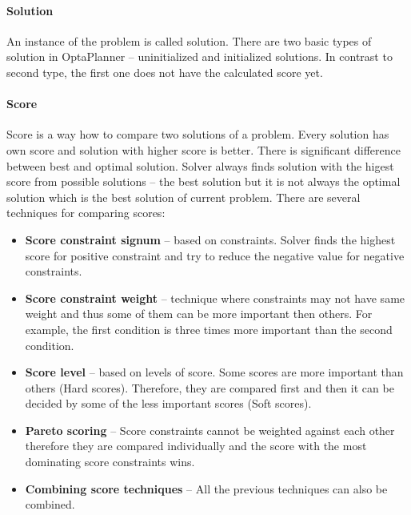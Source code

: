\paragraph{Solution}
An instance of the problem is called solution. There are two basic types of solution in OptaPlanner -- uninitialized and initialized solutions. In contrast to second type, the first one does not have the calculated score yet.

\paragraph{Score}\label{score}
Score is a way how to compare two solutions of a problem. Every solution has own score and solution with higher score is better. There is significant difference between best and optimal solution. Solver always finds solution with the higest score from possible solutions -- the best solution but it is not always the optimal solution which is the best solution of current problem. There are several techniques for comparing scores:
\begin{itemize}
\item \textbf{Score constraint signum} -- based on constraints. Solver finds the highest score for positive constraint and try to reduce the negative value for negative constraints.
\item \textbf{Score constraint weight} -- technique where constraints may not have same weight and thus some of them can be more important then others. For example, the first condition is three times more important than the second condition.
\item \textbf{Score level} -- based on levels of score. Some scores are more important than others (Hard scores). Therefore, they are compared first and then it can be decided by some of the less important scores (Soft scores).
\item \textbf{Pareto scoring} -- Score constraints cannot be weighted against each other therefore they are compared individually and the score with the most dominating score constraints wins.
\item \textbf{Combining score techniques} -- All the previous techniques can also be combined.
\end{itemize}

